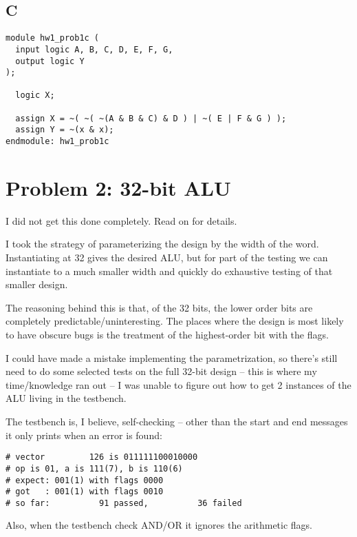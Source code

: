 \documentclass{article}
\begin{document}
\subsection{C}

\begin{Verbatim}[frame=single]
module hw1_prob1c (
  input logic A, B, C, D, E, F, G,
  output logic Y
);

  logic X;

  assign X = ~( ~( ~(A & B & C) & D ) | ~( E | F & G ) );
  assign Y = ~(x & x);
endmodule: hw1_prob1c
\end{Verbatim}
\section{Problem 2: 32-bit ALU}

I did not get this done completely.  Read on for details.

I took the strategy of parameterizing the design by the width of the word.
Instantiating at 32 gives the desired ALU, but for part of the testing
we can instantiate to a much smaller width and quickly do exhaustive testing
of that smaller design.

The reasoning behind this is that, of the 32 bits, the lower order
bits are completely predictable/uninteresting.  The places where the
design is most likely to have obscure bugs is the treatment of the
highest-order bit with the flags.

I could have made a mistake implementing the parametrization, so there's still
need to do some selected tests on the full 32-bit design -- this is where my time/knowledge ran out --
I was unable to figure out how to get 2 instances of the ALU living in the testbench.

The testbench is, I believe, self-checking -- other than the start and end messages it only prints when an error is found:
\begin{verbatim}
# vector         126 is 011111100010000
# op is 01, a is 111(7), b is 110(6)
# expect: 001(1) with flags 0000
# got   : 001(1) with flags 0010
# so far:          91 passed,          36 failed
\end{verbatim}


Also, when the testbench check AND/OR it ignores the arithmetic flags.

\end{document}
